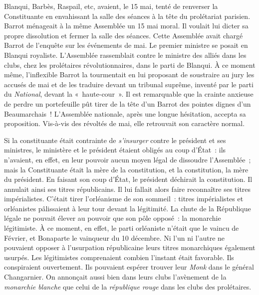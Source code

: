 \documentclass[french,twoside]{book} %
\begin{document}
Blanqui, Barbès, Raspail, etc, avaient, le 15 mai, tenté de renverser la Constituante en envahissant la salle des séances à la tête du prolétariat parisien. Barrot ménageait à la même Assemblée un 15 mai moral. Il voulait lui dicter sa propre dissolution et fermer la salle des séances. Cette Assemblée avait chargé Barrot de l’enquête sur les événements de mai. Le premier ministre se posait en Blanqui royaliste. L’Assemblée rassemblait contre le ministre des alliés dans les clubs, chez les prolétaires révolutionnaires, dans le parti de Blanqui. À ce moment même, l’inflexible Barrot la tourmentait en lui proposant de soustraire au jury les accusés de mai et de les traduire devant un tribunal suprême, inventé par le parti du \emph{National}, devant la « haute-cour ». Il est remarquable que la crainte anxieuse de perdre un portefeuille pût tirer de la tête d’un Barrot des pointes dignes d’un Beaumarchais ! L’Assemblée nationale, après une longue hésitation, accepta sa proposition. Vis-à-vis des révoltés de mai, elle retrouvait son caractère normal.\par
Si la constituante était contrainte de \emph{s’insurger} contre le président et ses ministres, le ministère et le président étaient obligés au coup d’État : ils n’avaient, en effet, en leur pouvoir aucun moyen légal de dissoudre l’Assemblée ; mais la Constituante était la mère de la constitution, et la constitution, la mère du président. En faisant son coup d’État, le président déchirait la constitution. Il annulait ainsi ses titres républicains. Il lui fallait alors faire reconnaître ses titres impérialistes. C’était tirer l’orléanisme de son sommeil : titres impérialistes et orléanistes pâlissaient à leur tour devant la légitimité. La chute de la République légale ne pouvait élever au pouvoir que son pôle opposé : la monarchie légitimiste. À ce moment, en effet, le parti orléaniste n’était que le vaincu de Février, et Bonaparte le vainqueur du 10 décembre. Ni l’un ni l’autre ne pouvaient opposer à l’usurpation républicaine leurs titres monarchiques également usurpés. Les légitimistes comprenaient combien l’instant était favorable. Ils conspiraient ouvertement. Ils pouvaient espérer trouver leur \emph{Monk} dans le général Changarnier. On annonçait aussi bien dans leurs clubs l’avènement de la \emph{monarchie blanche} que celui de la \emph{république rouge} dans les clubs des prolétaires.\par
\end{document}
